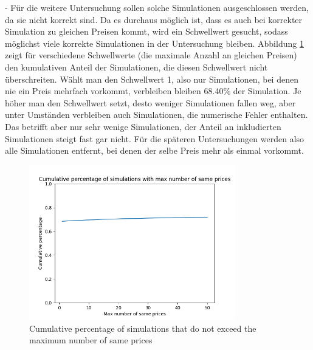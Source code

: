- Für die weitere Untersuchung sollen solche Simulationen ausgeschlossen werden, da sie nicht korrekt sind. Da es durchaus möglich ist, dass es auch bei korrekter Simulation zu gleichen Preisen kommt, wird ein Schwellwert gesucht, sodass möglichst viele korrekte Simulationen in der Untersuchung bleiben. Abbildung \ref{fig:max_number_of_same_prices_cumulative_percentage} zeigt für verschiedene Schwellwerte (die maximale Anzahl an gleichen Preisen) den kumulativen Anteil der Simulationen, die diesen Schwellwert nicht überschreiten. Wählt man den Schwellwert 1, also nur Simulationen, bei denen nie ein Preis mehrfach vorkommt, verbleiben bleiben 68.40\% der Simulation. Je höher man den Schwellwert setzt, desto weniger Simulationen fallen weg, aber unter Umständen verbleiben auch Simulationen, die numerische Fehler enthalten. Das betrifft aber nur sehr wenige Simulationen, der Anteil an inkludierten Simulationen steigt fast gar nicht. Für die späteren Untersuchungen werden also alle Simulationen entfernt, bei denen der selbe Preis mehr als einmal vorkommt.

\begin{figure}
    \centering
    \includegraphics[width=0.8\textwidth]{img/max_number_of_same_prices_cumulative_percentage.png}
    \caption{Cumulative percentage of simulations that do not exceed the maximum number of same prices}
    \label{fig:max_number_of_same_prices_cumulative_percentage}
\end{figure}

